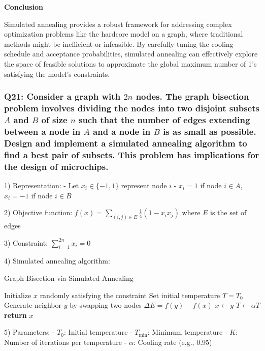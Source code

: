 \documentclass[8pt]{article}
\begin{document}
\textbf{Conclusion}

Simulated annealing provides a robust framework for addressing complex optimization problems like the hardcore model on a graph, where traditional methods might be inefficient or infeasible. By carefully tuning the cooling schedule and acceptance probabilities, simulated annealing can effectively explore the space of feasible solutions to approximate the global maximum number of 1's satisfying the model's constraints.

\subsubsection*{Q21: Consider a graph with \(2n\) nodes. The graph bisection problem involves dividing the nodes into two disjoint subsets \(A\) and \(B\) of size \(n\) such that the number of edges extending between a node in \(A\) and a node in \(B\) is as small as possible. Design and implement a simulated annealing algorithm to find a best pair of subsets. This problem has implications for the design of microchips.}

1) Representation:
   - Let $x_i \in \{-1,1\}$ represent node $i$
   - $x_i = 1$ if node $i \in A$, $x_i = -1$ if node $i \in B$

2) Objective function:
   $f(x) = \sum_{(i,j) \in E} \frac{1}{4}(1 - x_ix_j)$
   where $E$ is the set of edges

3) Constraint:
   $\sum_{i=1}^{2n} x_i = 0$

4) Simulated annealing algorithm:

   \begin{algorithm}
   \caption{Graph Bisection via Simulated Annealing}
   \begin{algorithmic}
   \State Initialize $x$ randomly satisfying the constraint
   \State Set initial temperature $T = T_0$
       \State Generate neighbor $y$ by swapping two nodes
       \State $\Delta E = f(y) - f(x)$
         \State $x \gets y$
       \EndIf
     \EndFor
     \State $T \gets \alpha T$ 
   \EndWhile
   \State \textbf{return} $x$
   \end{algorithmic}
   \end{algorithm}

5) Parameters:
   - $T_0$: Initial temperature
   - $T_{\text{min}}$: Minimum temperature
   - $K$: Number of iterations per temperature
   - $\alpha$: Cooling rate (e.g., 0.95)
\end{document}
